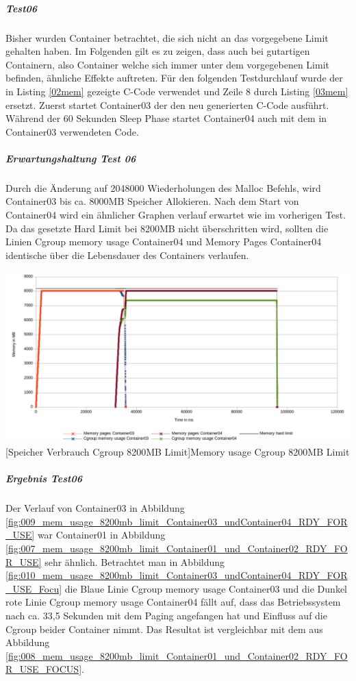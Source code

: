 \subparagraph{Test06}
Bisher wurden Container betrachtet, die sich nicht an das vorgegebene Limit gehalten haben. Im Folgenden gilt es zu zeigen, dass auch bei \glqq{}gutartigen\grqq{} Containern, also Container welche sich immer unter dem vorgegebenen Limit befinden, ähnliche Effekte auftreten. Für den folgenden Testdurchlauf wurde der in Listing \ref{02mem} gezeigte C-Code verwendet und Zeile 8 durch Listing \ref{03mem} ersetzt. Zuerst startet Container03 der den neu generierten C-Code ausführt. Während der 60 Sekunden Sleep Phase startet Container04 auch mit dem in Container03 verwendeten Code.

\vspace{1em}


\subparagraph{Erwartungshaltung Test 06}
Durch die Änderung auf 2048000 Wiederholungen des Malloc Befehls, wird Container03 bis ca. 8000MB Speicher Allokieren. Nach dem Start von Container04 wird ein ähnlicher Graphen verlauf erwartet wie im vorherigen Test. Da das gesetzte Hard Limit bei 8200MB nicht überschritten wird, sollten die Linien \glqq{}Cgroup memory usage Container04\grqq{} und \glqq{}Memory Pages Container04\grqq{} identische über die Lebensdauer des Containers verlaufen.

\vspace{1em}
\begin{minipage}{\linewidth}
	\centering
	\includegraphics[width=1\linewidth]{pics/009_mem_usage_8200mb_limit_Container03_undContainer04_RDY_FOR_USE.png}
	[Speicher Verbrauch Cgroup 8200MB Limit]{Memory usage Cgroup 8200MB Limit}
	\label{fig:009_mem_usage_8200mb_limit_Container03_undContainer04_RDY_FOR_USE}
\end{minipage}

\subparagraph{Ergebnis Test06}
Der Verlauf von Container03 in Abbildung \ref{fig:009_mem_usage_8200mb_limit_Container03_undContainer04_RDY_FOR_USE} war Container01 in Abbildung \ref{fig:007_mem_usage_8200mb_limit_Container01_und_Container02_RDY_FOR_USE} sehr ähnlich. Betrachtet man in Abbildung \ref{fig:010_mem_usage_8200mb_limit_Container03_undContainer04_RDY_FOR_USE_Focu} die Blaue Linie \glqq{}Cgroup memory usage Container03\grqq{} und die Dunkel rote Linie \glqq{}Cgroup memory usage Container04\grqq{} fällt auf, dass das Betriebssystem nach ca. 33,5 Sekunden mit dem Paging angefangen hat und Einfluss auf die Cgroup beider Container nimmt. Das Resultat ist vergleichbar mit dem aus Abbildung \ref{fig:008_mem_usage_8200mb_limit_Container01_und_Container02_RDY_FOR_USE_FOCUS}.  

